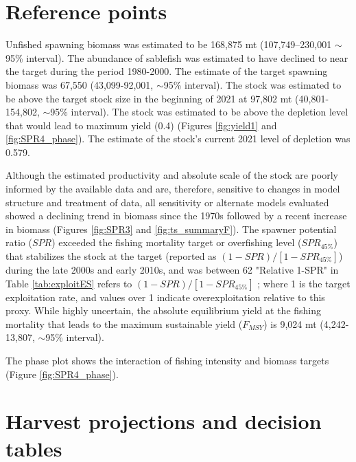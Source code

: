 \documentclass[11pt,
  english,
  a4paper,
]{article}
\begin{document}
\hypertarget{rp}{%
\section{Reference points}\label{rp}}

\leavevmode\tagmcend\tagstructend

Unfished spawning biomass was estimated to be 168,875 mt (107,749–230,001 $\sim$95\% interval). The abundance of sablefish was estimated to have declined to near the target during the period 1980-2000. The estimate of the target spawning biomass was 67,550 (43,099-92,001, $\sim$95\%  interval). The stock was estimated to be  above the target stock size in the beginning of 2021 at 97,802 mt (40,801-154,802, $\sim$95\% interval). The stock was estimated to be above the depletion level that would lead to maximum yield (0.4) (Figures \ref{fig:yield1} and \ref{fig:SPR4_phase}). The estimate of the stock's current 2021 level of depletion was 0.579.

Although the estimated productivity and absolute scale of the stock are poorly informed by the available data and are, therefore, sensitive to changes in model structure and treatment of data, all sensitivity or alternate models evaluated showed a declining trend in biomass since the 1970s followed by a recent increase in biomass (Figures \ref{fig:SPR3} and \ref{fig:ts_summaryF}). The spawner potential ratio ($SPR$)  exceeded the fishing mortality target or overfishing level ($SPR_{45\%}$) that stabilizes the stock at the target (reported as $(1-SPR)/[1-SPR_{45\%}]$) during the late 2000s and early 2010s, and was between 62%
"Relative 1-SPR" in Table \ref{tab:exploitES} refers to $(1-SPR)/[1-SPR_{45\%}]$ ; where 1 is the target exploitation rate, and values over 1 indicate overexploitation relative to this proxy. While highly uncertain, the
absolute equilibrium yield at the fishing mortality that leads to the maximum sustainable yield ($F_{MSY}$) is 9,024 mt (4,242-13,807, $\sim$95\% interval).


The phase plot shows the interaction of fishing intensity and biomass targets (Figure \ref{fig:SPR4_phase}).

\leavevmode\tagmcend\tagstructend\par


\hypertarget{harvest-projections-and-decision-tables}{%
\section{Harvest projections and decision tables}\label{harvest-projections-and-decision-tables}}
\end{document}
